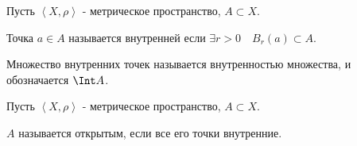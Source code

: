 
\begin{definition} \thmslashn 

    Пусть $\left<X, \rho\right>$ - метрическое пространство, $A \subset X$.

    Точка $a\in A$ называется внутренней если $\exists{r > 0}\quad B_{r}(a) \subset A$.

    Множество внутренних точек называется внутренностью множества, и обозначается $\Int A$.
\end{definition}
\begin{definition} \thmslashn 

    Пусть $\left<X, \rho\right>$ - метрическое пространство, $A \subset X$.

    $A$ называется открытым, если все его точки внутренние.
\end{definition}
